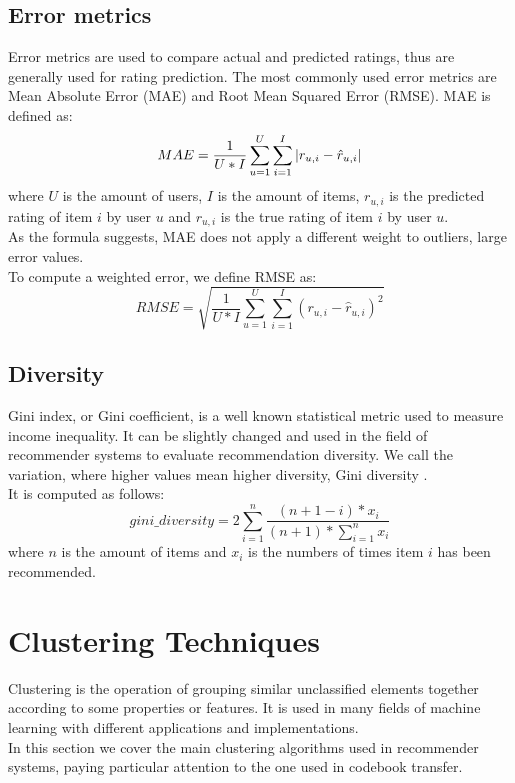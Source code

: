 \subsection{Error metrics}

Error metrics are used to compare actual and predicted ratings, thus are generally used for rating prediction. The most commonly used error metrics are Mean Absolute Error (MAE) and Root Mean Squared Error (RMSE).
MAE is defined as:
\begin{equation*}
MAE = \frac{1}{U*I} \sum_{u=1}^{U} \sum_{i=1}^{I} \left\lvert r_{u,i} - \hat{r}_{u,i}\right\rvert
\end{equation*}
where $U$ is the amount of users, $I$ is the amount of items, $r_{u,i}$ is the predicted rating of item $i$ by user $u$ and $r_{u,i}$ is the true rating of item $i$ by user $u$.\\
As the formula suggests, MAE does not apply a different weight to outliers, large error values.\\
To compute a weighted error, we define RMSE as:
\begin{equation*}
RMSE = \sqrt{\frac{1}{U*I} \sum_{u=1}^{U} \sum_{i=1}^{I} (r_{u,i} - \hat{r}_{u,i})^2}
\end{equation*}


\subsection{Diversity}

Gini index, or Gini coefficient, is a well known statistical metric used to measure income inequality. It can be slightly changed and used in the field of recommender systems to evaluate recommendation diversity. We call the variation, where higher values mean higher diversity, Gini diversity \cite{Diversity}.\\
It is computed as follows:
\begin{equation*}
gini\_diversity = 2 \sum_{i=1}^{n} \frac{(n + 1 - i) * x_i}{(n + 1) * \sum_{i=1}^{n} x_i}
\end{equation*}
where $n$ is the amount of items and $x_i$ is the numbers of times item $i$ has been recommended.



\section{Clustering Techniques}

Clustering is the operation of grouping similar unclassified elements together according to some properties or features. It is used in many fields of machine learning with different applications and implementations.\\
In this section we cover the main clustering algorithms used in recommender systems, paying particular attention to the one used in codebook transfer.



